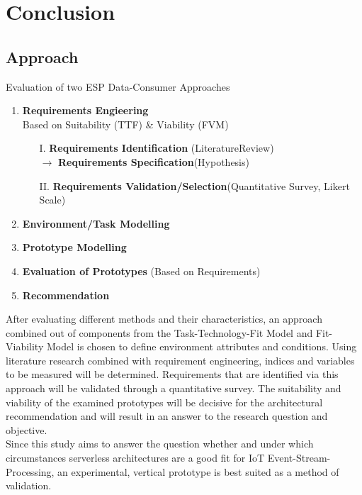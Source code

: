\begin{minipage}{\textwidth}
    \section{Conclusion}
    
    \subsection{Approach}\label{sec:approach}
    Evaluation of two ESP Data-Consumer Approaches
    \begin{enumerate}
        \item \textbf{Requirements Engieering}\\
            Based on Suitability (TTF) \& Viability (FVM)
            \begin{enumerate}
                \item[I.] \textbf{Requirements Identification} (LiteratureReview)\\
                    $\longrightarrow$ \textbf{Requirements Specification}(Hypothesis)
                \item[II.] \textbf{Requirements Validation/Selection}(Quantitative Survey, Likert Scale)
            \end{enumerate}
        \item \textbf{Environment/Task Modelling}
        \item \textbf{Prototype Modelling}
        \item \textbf{Evaluation of Prototypes} (Based on Requirements)
        \item \textbf{Recommendation}
    \end{enumerate}
    
    After evaluating different methods and their characteristics, an approach combined out of components from the Task-Technology-Fit Model and Fit-Viability Model is chosen to define environment attributes and conditions. Using literature research combined with requirement engineering, indices and variables to be measured will be determined. Requirements that are identified via this approach will be validated through a quantitative survey. The suitability and viability of the examined prototypes will be decisive for the architectural recommendation and will result in an answer to the research question and objective.\\
    Since this study aims to answer the question whether and under which circumstances serverless architectures are a good fit for IoT Event-Stream-Processing, an experimental, vertical prototype is best suited as a method of validation. 
    
\end{minipage}



